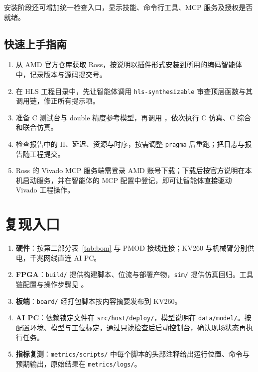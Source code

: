 安装阶段还可增加统一检查入口，显示技能、命令行工具、MCP 服务及授权是否就绪。

\subsection{快速上手指南}

\begin{enumerate}
  \item 从 AMD 官方仓库获取 Ross，按说明以插件形式安装到所用的编码智能体中，记录版本与源码提交号。
  \item 在 HLS 工程目录中，先让智能体调用 \texttt{hls-synthesizable} 审查顶层函数与其调用链，修正所有提示项。
  \item 准备 C 测试台与 double 精度参考模型，再调用 ，依次执行 C 仿真、C 综合和联合仿真。
  \item 检查报告中的 II、延迟、资源与时序，按需调整 \texttt{pragma} 后重跑；把日志与报告随工程提交。
  \item Ross 的 Vivado MCP 服务端需登录 AMD 账号下载；下载后按官方说明在本机启动服务，并在智能体的 MCP 配置中登记，即可让智能体直接驱动 Vivado 工程操作。
\end{enumerate}

\section{复现入口}

\begin{enumerate}
  \item \textbf{硬件}：按第二部分表~\ref{tab:bom} 与 PMOD 接线连接；KV260 与机械臂分别供电，千兆网线直连 AI PC。
  \item \textbf{FPGA}：\texttt{build/} 提供构建脚本、位流与部署产物，\texttt{sim/} 提供仿真回归。工具链配置与操作步骤见 。
  \item \textbf{板端}：\texttt{board/} 经打包脚本按内容摘要发布到 KV260。
  \item \textbf{AI PC}：依赖锁定文件在 \texttt{src/host/deploy/}，模型说明在 \texttt{data/model/}。按  配置环境、模型与工位标定，通过只读检查后启动控制台，确认现场状态再执行任务。
  \item \textbf{指标复测}：\texttt{metrics/scripts/} 中每个脚本的头部注释给出运行位置、命令与预期输出，原始结果在 \texttt{metrics/logs/}。
\end{enumerate}
